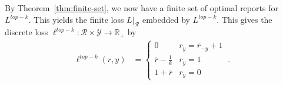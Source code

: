 \documentclass[12pt]{article}
\newcommand{\reals}{\mathbb{R}}
\newcommand{\prop}[1]{\Gamma[#1]}
\newcommand{\simplex}{\Delta_\Y}
\newcommand{\R}{\mathcal{R}}
\newcommand{\Y}{\mathcal{Y}}
\newtheorem{conjecture}{Conjecture}
\begin{document}
By Theorem~\ref{thm:finite-set}, we now have a finite set of optimal reports for $L^{top-k}$.
This yields the finite loss $L|_\R$ embedded by $L^{top-k}$.
This gives the discrete loss $\ell^{top-k} : \R \times\Y \to \reals_+$ by
\begin{align}
\ell^{top-k}(r,y) &= \begin{cases}
0 & r_y = \bar r_{-y} + 1\\
\bar r - \frac 1 k & r_y = 1\\
1 + \bar r & r_y = 0
\end{cases}~.~
\end{align}

\end{document}
